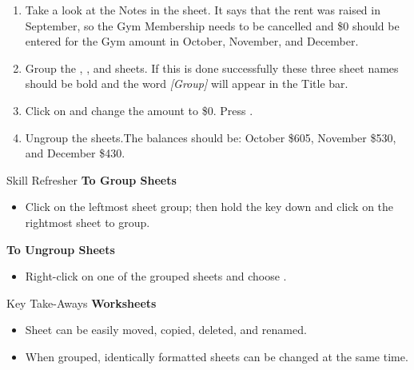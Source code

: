 \begin{enumerate}
	\item Take a look at the Notes in the  sheet. It says that the rent was raised in September, so the Gym Membership needs to be cancelled and \$0 should be entered for the Gym amount in October, November, and December.
	\item Group the , , and  sheets. If this is done successfully these three sheet names should be bold and the word \textit{[Group]} will appear in the Title bar.
	\item Click on  and change the amount to \$0. Press .
	\item Ungroup the sheets.The balances should be: October \$605, November \$530, and December \$430.
\end{enumerate}

\begin{center}
	\begin{sklbox}{Skill Refresher}
		\textbf{To Group Sheets}
		\\
		\begin{itemize}
			\setlength{\itemsep}{0pt}
			\setlength{\parskip}{0pt}
			\setlength{\parsep}{0pt}
			
			\item Click on the leftmost sheet group; then hold the  key down and click on the rightmost sheet to group.
		\end{itemize}
			
		\bigskip
			
		\textbf{To Ungroup Sheets}
		\begin{itemize}
			\setlength{\itemsep}{0pt}
			\setlength{\parskip}{0pt}
			\setlength{\parsep}{0pt}
			
			\item Right-click on one of the grouped sheets and choose .
		\end{itemize}
	\end{sklbox}
\end{center}

\begin{center}
	\begin{tkwbox}{Key Take-Aways}
		\textbf{Worksheets}
		\\
		\begin{itemize}
			\setlength{\itemsep}{0pt}
			\setlength{\parskip}{0pt}
			\setlength{\parsep}{0pt}
			
			\item Sheet can be easily moved, copied, deleted, and renamed.
			\item When grouped, identically formatted sheets can be changed at the same time.
			
		\end{itemize}
	\end{tkwbox}
\end{center}

